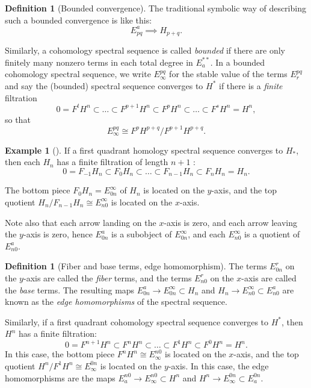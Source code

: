 \documentclass[reqno]{amsart}
\theoremstyle{definition}
\newtheorem{definition}[theorem]{Definition}
\newtheorem{example}[theorem]{Example}
\theoremstyle{remark}
\begin{document}
\begin{definition}[Bounded convergence]
    The traditional symbolic way of describing such a bounded
    convergence is like this:
    \[
    E_{pq}^{a} \implies H_{p+q}.
    \] 

    Similarly, a cohomology spectral sequence is
    called \textit{bounded} if there are
    only finitely many nonzero terms in each total 
    degree in $E_a^{* *}$. In a bounded cohomology
    spectral sequence, we write
    $E_{\infty}^{p q}$ for the stable value of the
    terms $E_{r}^{pq}$ and say the (bounded) spectral
    sequence converges to $H^{*}$ if there is a
    \textit{finite} filtration
    \[
    0 = F^{t} H^{n} \subset \ldots \subset 
    F^{p+1} H^{n} \subset F^{p} H^{n} \subset \ldots
    \subset  F^{s} H^{n} = H^{n},
    \] 
    so that
    \[
    E_{\infty}^{pq} \cong F^{p} H^{p+q} / F^{p+1} H^{p+q}.
    \] 
\end{definition}

    \begin{example}[]
        If a first quadrant homology spectral sequence converges
        to $H_*$, then each $H_n$ has a finite filtration of length
        $n+1$ :
        \[
        0 = F_{-1} H_n \subset F_0 H_n \subset 
        \ldots \subset F_{n-1} H_n \subset 
        F_n H_n = H_n.
        \] 

        The bottom piece
        $F_0 H_n = E_{0n}^{\infty}$ of $H_n$ is located
        on the $y$-axis, and the top quotient
        $H_n / F_{n-1} H_n \cong E_{n 0}^{\infty}$ is located
        on the $x$-axis.

        Note also that each arrow landing on the
        $x$-axis is zero, and each arrow leaving the
        $y$-axis is zero, hence
        $E_{0n}^{a}$ is a subobject of
        $E_{0 n}^{\infty}$, and each
        $E_{n 0}^{\infty}$ is a quotient of
        $E_{n 0}^{a}$.

        \begin{definition}[Fiber and base terms, edge homomorphism]
            The terms $E_{0n}^{r}$ on the $y$-axis are
            called the \textit{fiber} terms, and the
            terms $E_{n 0}^{r}$ on the $x$-axis are called the
            \textit{base} terms. The
            resulting maps $E_{0 n}^{a} \to 
            E_{0n}^{\infty} \subset H_n$ and
            $H_n \to E_{n 0}^{\infty} \subset 
            E_{n 0}^{a}$ are known as the \textit{edge homomorphisms}
            of the spectral sequence.
        \end{definition}


        Similarly, if a first quadrant cohomology spectral
        sequence converges to $H^{*}$, then
        $H^{n}$ has a finite filtration:
        \[
        0 = F^{n+1} H^{n} \subset F^{n} H^{n} \subset 
        \ldots \subset 
        F^{1} H^{n} \subset F^{0} H^{n} = H^{n}.
        \] 
        In this case, the bottom piece $F^{n} H^{n} \cong
        E_{\infty}^{n 0}$ is located on the $x$-axis, and the
        top quotient $H^{n} / F^{1} H^{n} \cong
        E_{\infty}^{0 n}$ is located on the $y$-axis.
        In this case, the edge homomorphisms are the
        maps $E_a^{n 0} \to E_{\infty}^{n 0} \subset H^{n}$ 
        and $H^{n} \to E_{\infty}^{0n} \subset E_a^{0n}$.
    \end{example}
\end{document}
